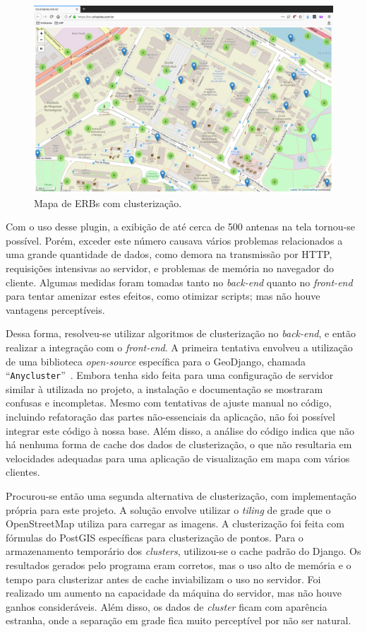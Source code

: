 \documentclass[]{politex}
\begin{document}
\begin{figure}[H]
    \centering
    \includegraphics[width=6in]{imagens/mapa_com_clusters}
    \caption{Mapa de ERBs com clusterização.}
    \label{fig:mapa_com_clusters}
\end{figure}

Com o uso desse plugin, a exibição de até cerca de 500 antenas na tela tornou-se
possível. Porém, exceder este número causava vários problemas relacionados a uma
grande quantidade de dados, como demora na transmissão por HTTP, requisições
intensivas ao servidor, e problemas de memória no navegador do cliente. Algumas
medidas foram tomadas tanto no \textit{back-end} quanto no \textit{front-end}
para tentar amenizar estes efeitos, como otimizar scripts; mas não houve
vantagens perceptíveis.

Dessa forma, resolveu-se utilizar algoritmos de clusterização no
\textit{back-end}, e então realizar a integração com o \textit{front-end}. A
primeira tentativa envolveu a utilização de uma biblioteca \textit{open-source}
específica para o GeoDjango, chamada ``\texttt{Anycluster}''~\cite{anycluster}.
Embora tenha sido feita para uma configuração de servidor similar à utilizada no
projeto, a instalação e documentação se mostraram confusas e incompletas. Mesmo
com tentativas de ajuste manual no código, incluindo refatoração das partes
não-essenciais da aplicação, não foi possível integrar este código à nossa base.
Além disso, a análise do código indica que não há nenhuma forma de cache dos
dados de clusterização, o que não resultaria em velocidades adequadas para uma
aplicação de visualização em mapa com vários clientes.

Procurou-se então uma segunda alternativa de clusterização, com implementação
própria para este projeto. A solução envolve utilizar o \textit{tiling} de grade
que o OpenStreetMap utiliza para carregar as imagens. A clusterização foi feita
com fórmulas do PostGIS específicas para clusterização de pontos. Para o
armazenamento temporário dos \textit{clusters}, utilizou-se o cache padrão do
Django. Os resultados gerados pelo programa eram corretos, mas o uso alto de
memória e o tempo para clusterizar antes de cache inviabilizam o uso no
servidor. Foi realizado um aumento na capacidade da máquina do servidor, mas não
houve ganhos consideráveis. Além disso, os dados de \textit{cluster} ficam com
aparência estranha, onde a separação em grade fica muito perceptível por não ser
natural.
\end{document}
